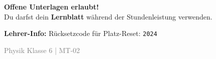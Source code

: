 \documentclass[11pt, a4paper]{article}
\begin{document}

\begin{tcolorbox}[
    colback=white,
    colframe=erfolg,
    boxrule=1.5pt,
    arc=0pt
]
\textbf{\textcolor{erfolg}{Offene Unterlagen erlaubt!}}\\[0.3em]
Du darfst dein \textbf{Lernblatt} während der Stundenleistung verwenden.
\end{tcolorbox}

\vfill


\begin{tcolorbox}[
    colback=gray!10,
    colframe=gray,
    boxrule=1pt,
    arc=0pt
]
\textbf{Lehrer-Info:} Rücksetzcode für Platz-Reset: \texttt{2024}
\end{tcolorbox}


\begin{center}
\textcolor{gray}{\small Physik Klasse 6 | MT-02}
\end{center}
\end{document}
